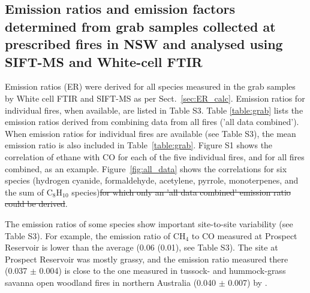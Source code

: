 \documentclass[acp, manuscript]{copernicus}
\providecommand{\DIFadd}[1]{{\protect\color{blue}\uwave{#1}}} %
\providecommand{\DIFdel}[1]{{\protect\color{red}\sout{#1}}}                      %
\providecommand{\DIFaddbegin}{} %
\providecommand{\DIFaddend}{} %
\providecommand{\DIFdelbegin}{} %
\providecommand{\DIFdelend}{} %
\begin{document}
\subsection{Emission ratios and emission factors determined from grab samples collected at prescribed fires in NSW and analysed using SIFT-MS and White-cell FTIR} 
Emission ratios (ER) were derived for all species measured in the grab samples by White cell FTIR and SIFT-MS as per Sect.~\ref{sec:ER_calc}. Emission ratios for individual fires, when available, are listed in Table S3. Table \ref{table:grab} lists the emission ratios derived from combining data from all fires ('all data combined'). When emission ratios for individual fires are available (see Table S3), the mean emission ratio is also included in Table~\ref{table:grab}. Figure S1 shows the correlation of ethane with CO for each of the five individual fires, and for all fires combined, as an example. Figure~\ref{fig:all_data} shows the \DIFaddbegin \DIFadd{"all data combined" }\DIFaddend correlations for six species (hydrogen cyanide, formaldehyde, acetylene, pyrrole, monoterpenes, and the sum of C$_8$H$_{10}$ species)\DIFdelbegin \DIFdel{for which only an 'all data combined' emission ratio could be derived}\DIFdelend .

The emission ratios of some species show important site-to-site variability (see Table S3). For example, the emission ratio of CH$_4$ to CO measured at Prospect Reservoir is lower than the average (0.06 (0.01), see Table S3). The site at Prospect Reservoir was mostly grassy, and the emission ratio measured there (0.037 $\pm$ 0.004) is close to the one measured in tussock- and hummock-grass savanna open woodland fires in northern Australia (0.040 $\pm$ 0.007) by \citet{Smith2014}.
\end{document}

